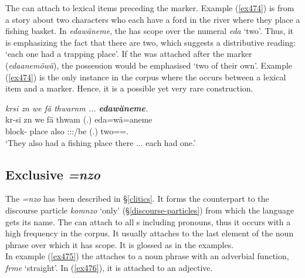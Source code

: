 The   can attach to lexical items preceding the  marker. Example (\ref{ex474}) is from a story about two characters who each have a ford in the river where they place a fishing basket. In \emph{edawäneme}, the  has scope over the numeral \emph{eda} `two'. Thus, it is emphasizing the fact that there are two, which suggests a distributive reading: `each one had a trapping place'. If the  was attached after the  marker (\emph{edaanemöwä}), the possession would be emphasised `two of their own'. Example (\ref{ex474}) is the only instance in the corpus where the   occurs between a lexical item and a  marker. Hence, it is a possible yet very rare construction. 
 
\begin{exe}
	\ex \emph{krsi zn we fä thwarnm ... \textbf{edawäneme}.}\\
	\gll kr-si zn we fä thwam (.) eda=wä=aneme\\
	block-\Nmlz{} place also \Dist{} \Stdu:\Io:\Pst:\Dur/be (.) two=\Emph=\Poss.\Nsg{}\\
	\trans `They also had a fishing place there ... each had one.'\\
	\label{ex474}
\end{exe}

\subsection{Exclusive \emph{=nzo}} \label{exclusivenzo}

The   \emph{=nzo} has been described in \S{}\ref{clitics}. It forms the  counterpart to the discourse particle \emph{komnzo} `only' (\S{}\ref{discourse-particles}) from which the language gets its name. The   can attach to all s including pronouns, thus it occurs with a high frequency in the corpus. It usually attaches to the last element of the noun phrase over which it has scope. It is glossed as \Only{} in the examples.\\

In example (\ref{ex475}) the   attaches to a noun phrase with an adverbial function, \emph{frme} `straight'. In (\ref{ex476}), it is attached to an adjective.

